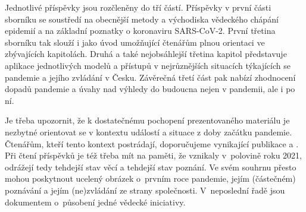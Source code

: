 Jednotlivé příspěvky jsou rozčleněny do tří částí. Příspěvky v první části sborníku se soustředí na obecnější metody a východiska vědeckého chápání epidemií a na základní poznatky o koronaviru SARS-CoV-2. První třetina sborníku tak slouží i jako úvod umožňující čtenářům plnou orientaci ve zbývajících kapitolách. Druhá a také nejobsáhlejší třetina kapitol představuje aplikace jednotlivých modelů a přístupů v nejrůznějších situacích týkajících se pandemie a jejího zvládání v Česku. Závěrečná třetí část pak nabízí zhodnocení dopadů pandemie a úvahy nad výhledy do budoucna nejen v pandemii, ale i po ní.

Je třeba upozornit, že k dostatečnému pochopení prezentovaného materiálu je nezbytné orientovat se v kontextu událostí a situace z doby začátku pandemie. Čtenářům, kteří tento kontext postrádají, doporučujeme vynikající publikace \cite{kubal1} a \cite{kubal2}.
Při čtení příspěvků je též třeba mít na paměti, že vznikaly v~polovině roku 2021, odrážejí tedy tehdejší stav věcí a tehdejší stav poznání. Ve svém souhrnu přesto mohou poskytnout ucelený obrázek o~prvním roce pandemie, jejím (částečném) poznávání a jejím (ne)zvládání ze strany společnosti. V~neposlední řadě jsou dokumentem o~působení jedné vědecké iniciativy.
